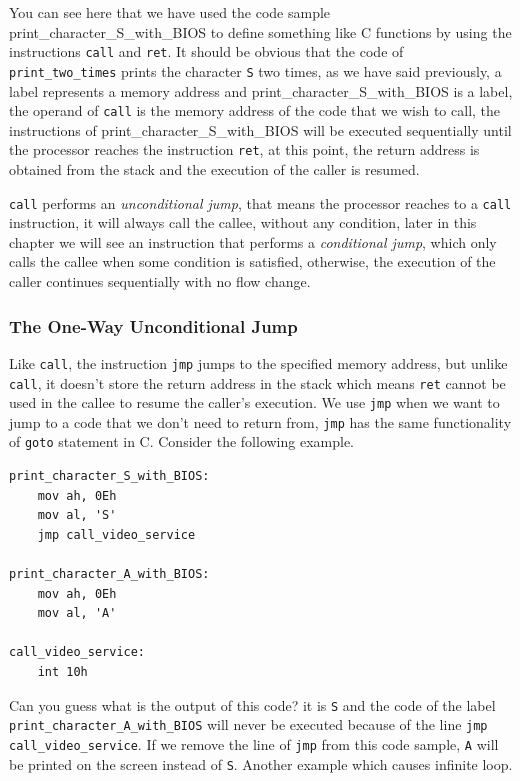 You can see here that we have used the code sample
print\_character\_S\_with\_BIOS to define something like C functions by
using the instructions \lstinline!call! and \lstinline!ret!. It should
be obvious that the code of \lstinline!print_two_times! prints the
character \lstinline!S! two times, as we have said previously, a label
represents a memory address and print\_character\_S\_with\_BIOS is a
label, the operand of \lstinline!call! is the memory address of the code
that we wish to call, the instructions of
print\_character\_S\_with\_BIOS will be executed sequentially until the
processor reaches the instruction \lstinline!ret!, at this point, the
return address is obtained from the stack and the execution of the
caller is resumed.

\lstinline!call! performs an \emph{unconditional jump}, that means the
processor reaches to a \lstinline!call! instruction, it will always call
the callee, without any condition, later in this chapter we will see an
instruction that performs a \emph{conditional jump}, which only calls
the callee when some condition is satisfied, otherwise, the execution of
the caller continues sequentially with no flow change.

\subsubsection{The One-Way Unconditional
Jump}\label{the-one-way-unconditional-jump}

Like \lstinline!call!, the instruction \lstinline!jmp! jumps to the
specified memory address, but unlike \lstinline!call!, it doesn't store
the return address in the stack which means \lstinline!ret! cannot be
used in the callee to resume the caller's execution. We use
\lstinline!jmp! when we want to jump to a code that we don't need to
return from, \lstinline!jmp! has the same functionality of
\lstinline!goto! statement in C. Consider the following example.

\begin{lstlisting}
print_character_S_with_BIOS:
    mov ah, 0Eh
    mov al, 'S'
    jmp call_video_service

print_character_A_with_BIOS:
    mov ah, 0Eh
    mov al, 'A'

call_video_service:
    int 10h
\end{lstlisting}

Can you guess what is the output of this code? it is \lstinline!S! and
the code of the label \lstinline!print_character_A_with_BIOS! will never
be executed because of the line \lstinline!jmp call_video_service!. If
we remove the line of \lstinline!jmp! from this code sample,
\lstinline!A! will be printed on the screen instead of \lstinline!S!.
Another example which causes infinite loop.

